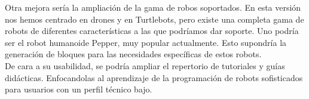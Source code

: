 Otra mejora sería la ampliación de la gama de robos soportados. En esta versión nos hemos centrado en drones y en Turtlebots, pero existe una completa gama de robots de diferentes características a las que podríamos dar soporte. Uno podría ser el robot humanoide Pepper, muy popular actualmente. Esto supondría la generación de bloques para las necesidades específicas de estos robots.\\

De cara a su usabilidad, se podría ampliar el repertorio de tutoriales y guías didácticas. Enfocandolas al aprendizaje de la programación de robots sofisticados para usuarios con un perfil técnico bajo.\\